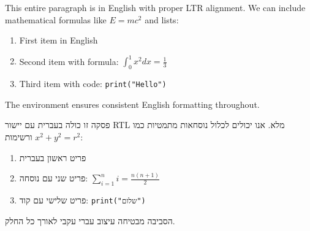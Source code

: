 \documentclass{hebrew-academic-template}
\begin{document}

\begin{english}
This entire paragraph is in English with proper LTR alignment.
We can include mathematical formulas like $E = mc^2$ and lists:

\begin{enumerate}
    \item First item in English
    \item Second item with formula: $\int_0^1 x^2 dx = \frac{1}{3}$
    \item Third item with code: \texttt{print("Hello")}
\end{enumerate}

The environment ensures consistent English formatting throughout.
\end{english}


\begin{hebrew}
פסקה זו כולה בעברית עם יישור RTL מלא.
אנו יכולים לכלול נוסחאות מתמטיות כמו $x^2 + y^2 = r^2$ ורשימות:

\begin{enumerate}
    \item פריט ראשון בעברית
    \item פריט שני עם נוסחה: $\sum_{i=1}^n i = \frac{n(n+1)}{2}$
    \item פריט שלישי עם קוד: \texttt{print("שלום")}
\end{enumerate}

הסביבה מבטיחה עיצוב עברי עקבי לאורך כל החלק.
\end{hebrew}


\end{document}
